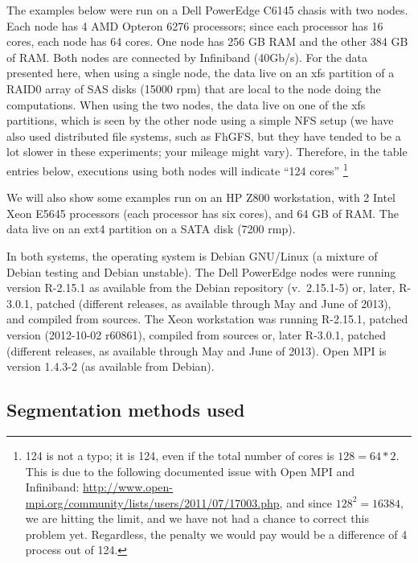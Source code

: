 \documentclass[a4paper,11pt]{article}
\begin{document}



The examples below were run on a Dell PowerEdge C6145 chasis with two
nodes. Each node has 4 AMD Opteron 6276 processors; since each processor
has 16 cores, each node has 64 cores. One node has 256 GB RAM and the
other 384 GB of RAM. Both nodes are connected by Infiniband (40Gb/s).  For
the data presented here, when using a single node, the data live on an xfs
partition of a RAID0 array of SAS disks (15000 rpm) that are local to the
node doing the computations. When using the two nodes, the data live on
one of the xfs partitions, which is seen by the other node using a simple
NFS setup (we have also used distributed file systems, such as FhGFS, but
they have tended to be a lot slower in these experiments; your mileage
might vary). Therefore, in the table entries below, executions using both
nodes will indicate ``124 cores'' \footnote{124 is not a typo; it is 124,
  even if the total number of cores is $128 = 64 * 2$. This is due to the
  following documented issue with Open MPI and Infiniband:
  \url{http://www.open-mpi.org/community/lists/users/2011/07/17003.php},
  and since $128^2 = 16384$, we are hitting the limit, and we have not had
  a chance to correct this problem yet. Regardless, the penalty we would
  pay would be a difference of 4 process out of 124.}

  
We will also show some examples run on an HP Z800 workstation, with 2
Intel Xeon E5645 processors (each processor has six cores), and 64 GB of
RAM. The data live on an ext4 partition on a SATA disk (7200 rmp). %


In both systems, the operating system is Debian GNU/Linux (a mixture of
Debian testing and Debian unstable). The Dell PowerEdge nodes were running
version R-2.15.1 as available from the Debian repository (v.\ 2.15.1-5)
or, later, R-3.0.1, patched (different releases, as available through May
and June of 2013), and compiled from sources. The Xeon workstation was
running R-2.15.1, patched version (2012-10-02 r60861), compiled from
sources or, later R-3.0.1, patched (different releases, as available
through May and June of 2013). Open MPI is version 1.4.3-2 (as available
from Debian).


\subsection{Segmentation methods used}\label{methods}
\end{document}
